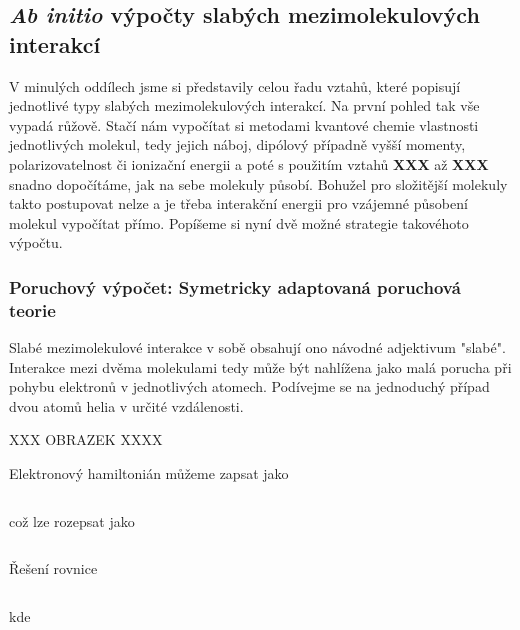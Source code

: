 \subsection{\textit{Ab initio} výpočty slabých mezimolekulových interakcí}

V minulých oddílech jsme si představily celou řadu vztahů, které popisují jednotlivé typy slabých mezimolekulových interakcí. Na první pohled tak vše vypadá růžově. Stačí nám vypočítat si metodami kvantové chemie vlastnosti jednotlivých molekul, tedy jejich náboj, dipólový případně vyšší momenty, polarizovatelnost či ionizační energii a poté s použitím vztahů \textbf{XXX} až \textbf{XXX} snadno dopočítáme, jak na sebe molekuly působí. Bohužel pro složitější molekuly takto postupovat nelze a je třeba interakční energii pro vzájemné působení molekul vypočítat přímo. Popíšeme si nyní dvě možné strategie takovéhoto výpočtu.


\subsubsection{Poruchový výpočet: Symetricky adaptovaná poruchová teorie}

Slabé mezimolekulové interakce v sobě obsahují ono návodné adjektivum "slabé". Interakce mezi dvěma molekulami tedy může být nahlížena jako malá porucha při pohybu elektronů v jednotlivých atomech. Podívejme se na jednoduchý případ dvou atomů helia v určité vzdálenosti.


\bigskip
XXX OBRAZEK XXXX
\bigskip


Elektronový hamiltonián můžeme zapsat jako


\begin{equation}
\label{rov:XXX}
\end{equation}



\noindent což lze rozepsat jako 

\begin{equation}
\label{rov:XXX}
\end{equation}

\noindent Řešení rovnice 

\begin{equation}
\label{rov:XXX}
\end{equation}


\noindent kde 

\begin{equation}
\label{rov:XXX}
\end{equation}


